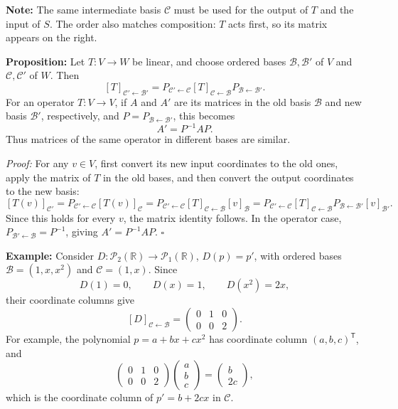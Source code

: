 \documentclass[a4paper,11pt,abstract=true]{scrartcl}
\theoremstyle{dotlessP}
\theoremstyle{dotlessS}
\theoremstyle{remark}
\theoremstyle{definition}
\begin{document}
\begin{remark_box}
\textbf{Note:} The same intermediate basis $\mathcal{C}$ must be
used for the output of $T$ and the input of $S$. The order also matches
composition: $T$ acts first, so its matrix appears on the right.
\end{remark_box}

\begin{problem_box}
\textbf{Proposition:} Let
$T:V\longrightarrow W$ be linear, and choose ordered bases
$\mathcal{B},\mathcal{B}'$ of $V$ and $\mathcal{C},\mathcal{C}'$ of $W$.
Then
\[
{[T]}_{\mathcal{C}'\leftarrow\mathcal{B}'}
=P_{\mathcal{C}'\leftarrow\mathcal{C}}
{[T]}_{\mathcal{C}\leftarrow\mathcal{B}}
P_{\mathcal{B}\leftarrow\mathcal{B}'}.
\]
For an operator $T:V\longrightarrow V$, if $A$ and $A'$ are its
matrices in the old basis $\mathcal{B}$ and new basis $\mathcal{B}'$,
respectively, and $P=P_{\mathcal{B}\leftarrow\mathcal{B}'}$, this becomes
\[
A'=P^{-1}AP.
\]
Thus matrices of the same operator in different bases are similar.
\end{problem_box}

\begin{claim_box}
\textit{Proof:} For any $v\in V$, first convert its new input
coordinates to the old ones, apply the matrix of $T$ in the old bases,
and then convert the output coordinates to the new basis:
\[
{[T(v)]}_{\mathcal{C}'}
=P_{\mathcal{C}'\leftarrow\mathcal{C}}
{[T(v)]}_{\mathcal{C}}
=P_{\mathcal{C}'\leftarrow\mathcal{C}}
{[T]}_{\mathcal{C}\leftarrow\mathcal{B}}
{[v]}_{\mathcal{B}}
=P_{\mathcal{C}'\leftarrow\mathcal{C}}
{[T]}_{\mathcal{C}\leftarrow\mathcal{B}}
P_{\mathcal{B}\leftarrow\mathcal{B}'}
{[v]}_{\mathcal{B}'}.
\]
Since this holds for every $v$, the matrix identity follows. In the
operator case, $P_{\mathcal{B}'\leftarrow\mathcal{B}}=P^{-1}$, giving
$A'=P^{-1}AP$. \hfill$\square$
\end{claim_box}

\begin{example_box}
\textbf{Example:} Consider
$D:\mathcal{P}_2(\mathbb{R})\longrightarrow\mathcal{P}_1(\mathbb{R})$,
$D(p)=p'$, with ordered bases
$\mathcal{B}=(1,x,x^2)$ and $\mathcal{C}=(1,x)$. Since
\[
D(1)=0,\qquad D(x)=1,\qquad D(x^2)=2x,
\]
their coordinate columns give
\[
{[D]}_{\mathcal{C}\leftarrow\mathcal{B}}
=\begin{pmatrix}0&1&0\\0&0&2\end{pmatrix}.
\]
For example, the polynomial $p=a+bx+cx^2$ has coordinate column
${(a,b,c)}^{\mathsf{T}}$, and
\[
\begin{pmatrix}0&1&0\\0&0&2\end{pmatrix}
\begin{pmatrix}a\\b\\c\end{pmatrix}
=\begin{pmatrix}b\\2c\end{pmatrix},
\]
which is the coordinate column of $p'=b+2cx$ in $\mathcal{C}$.
\end{example_box}
\end{document}
